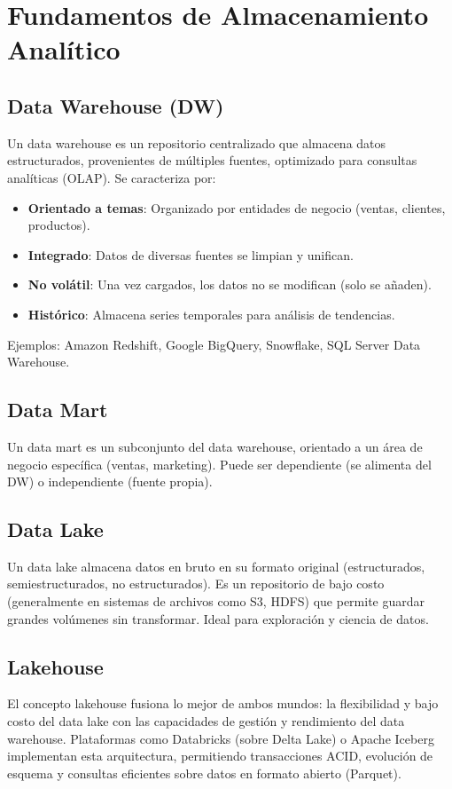 \documentclass[12pt,a4paper,openany,oneside]{book}
\begin{document}
\chapter{Fundamentos de Almacenamiento Analítico}
\section{Data Warehouse (DW)}
Un data warehouse es un repositorio centralizado que almacena datos estructurados, provenientes de múltiples fuentes, optimizado para consultas analíticas (OLAP). Se caracteriza por:
\begin{itemize}
    \item \textbf{Orientado a temas}: Organizado por entidades de negocio (ventas, clientes, productos).
    \item \textbf{Integrado}: Datos de diversas fuentes se limpian y unifican.
    \item \textbf{No volátil}: Una vez cargados, los datos no se modifican (solo se añaden).
    \item \textbf{Histórico}: Almacena series temporales para análisis de tendencias.
\end{itemize}
Ejemplos: Amazon Redshift, Google BigQuery, Snowflake, SQL Server Data Warehouse.

\section{Data Mart}
Un data mart es un subconjunto del data warehouse, orientado a un área de negocio específica (ventas, marketing). Puede ser dependiente (se alimenta del DW) o independiente (fuente propia).

\section{Data Lake}
Un data lake almacena datos en bruto en su formato original (estructurados, semiestructurados, no estructurados). Es un repositorio de bajo costo (generalmente en sistemas de archivos como S3, HDFS) que permite guardar grandes volúmenes sin transformar. Ideal para exploración y ciencia de datos.

\section{Lakehouse}
El concepto lakehouse fusiona lo mejor de ambos mundos: la flexibilidad y bajo costo del data lake con las capacidades de gestión y rendimiento del data warehouse. Plataformas como Databricks (sobre Delta Lake) o Apache Iceberg implementan esta arquitectura, permitiendo transacciones ACID, evolución de esquema y consultas eficientes sobre datos en formato abierto (Parquet).
\end{document}
